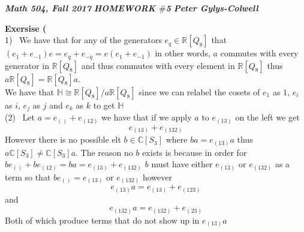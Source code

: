 \documentclass[12pt]{article}
\newenvironment{ques}[1]{\textbf{Exersise #1}\vspace{1 mm}\\ }{\bigskip}
\theoremstyle{definition}
\newcommand{\R}{\mathbb R}
\newcommand{\C}{\mathbb C}
\renewcommand{\H}{\mathbb H}
\begin{document}
\noindent \textit{\textbf{Math 504, Fall 2017}} \hspace{1.3cm}
\textit{\textbf{HOMEWORK $\#$5}} \hspace{1.3cm} \textit{\textbf{Peter
Gylys-Colwell}} 

\vspace{1cm}

\begin{ques}{5.1}
	(1) \ We have that for any of the generators $e_q \in \R[Q_8]$ that $(e_1 +
	e_{-1})e = e_q + e_{-q} = e(e_1 + e_{-1})$ in other words, $a$ commutes
	with every generator in $\R[Q_8]$ and thus commutes with every element in
	$\R[Q_8]$ thus $a\R[Q_8] = \R[Q_8]a$.\\
	We have that $\H \cong \R[Q_8]/a\R[Q_8]$ since we can relabel the cosets of
	$e_1$ as $1$, $e_i$ as $i$, $e_j$ as $j$ and $e_k$ as $k$ to get $\H$
	\\
	(2) \ Let $a = e_{()} + e_{(12)}$ we have that if we apply $a$ to
	$e_{(13)}$ on the left we get 
	$$e_{(13)} + e_{(132)}$$
	However there is no possible elt $b \in \C[S_3]$ where $ba = e_{(13)}a$
	thus $a\C[S_3] \neq \C[S_3]a$. The reason no $b$ exists is because in order
	for $be_{()} + be_{(12)} = ba = e_{(13)} + e_{(132)}$
	$b$ must have either $e_{(13)}$ or
	$e_{(132)}$ as a term so that $be_{()} = e_{(13)}$ or $e_{(132)}$ however 
	$$e_{(13)}a = e_{(13)} + e_{(123)}$$
	and 
	$$e_{(132)}a = e_{(132)} + e_{(23)}$$
	Both of which produce terms that do not show up in $e_{(13)}a$
\end{ques}
\end{document}
